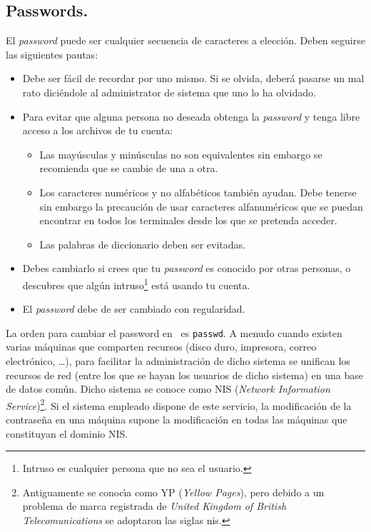 \subsection{Passwords.}

El {\it password} puede ser cualquier secuencia de caracteres a
elecci{\'o}n.  Deben seguirse las siguientes pautas:

\begin{itemize}
  
\item Debe ser f{\'a}cil de recordar por uno mismo. Si se olvida, deber{\'a}
  pasarse un mal rato dici{\'e}ndole al administrator de sistema que uno
  lo ha olvidado.
  
\item Para evitar que alguna persona no deseada obtenga la {\it
    password} y tenga libre acceso a los archivos de tu cuenta:

\begin{itemize}

\item Las may{\'u}sculas y min{\'u}sculas no son equivalentes sin embargo se
recomienda que se cambie de una a otra.

\item Los caracteres num{\'e}ricos y no alfab{\'e}ticos tambi{\'e}n ayudan. Debe
  tenerse sin embargo la precauci{\'o}n de usar caracteres alfanum{\'e}ricos
  que se puedan encontrar en todos los terminales desde los que se
  pretenda acceder.

\item Las palabras de diccionario deben ser evitadas.

\end{itemize}

\item Debes cambiarlo si crees que tu {\it password} es conocido por otras
  personas, o descubres que alg{\'u}n intruso\footnote{Intruso es
    cualquier persona que no sea el usuario.} est{\'a} usando tu cuenta.

\item El {\it password} debe de ser cambiado con regularidad.

\end{itemize}

La orden para cambiar el password en \unix\ es \verb+passwd+. A menudo
cuando existen varias m{\'a}quinas que comparten recursos (disco duro,
impresora, correo electr{\'o}nico, \ldots ), para facilitar la administraci{\'o}n
de dicho sistema se unifican los recursos de red (entre los que se
hayan los usuarios de dicho sistema) en una base de datos com{\'u}n. Dicho
sistema se conoce como NIS ({\it Network Information
  Service})\footnote{Antiguamente se conoc{\'\i}a como YP ({\it Yellow
    Pages}), pero debido a un problema de marca registrada de {\it
    United Kingdom of British Telecomunications} se adoptaron las
  siglas {\sc nis}.}. Si el sistema empleado dispone de este servicio,
la modificaci{\'o}n de la contrase{\~n}a en una m{\'a}quina supone la modificaci{\'o}n
en todas las m{\'a}quinas que constituyan el dominio NIS.

